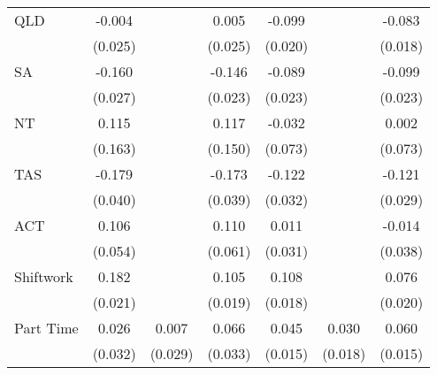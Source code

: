 {\begin{tabular}{l*{6}{c}}
QLD                 &      -0.004         &                     &       0.005         &      -0.099\sym{***}&                     &      -0.083\sym{***}\\
                    &     (0.025)         &                     &     (0.025)         &     (0.020)         &                     &     (0.018)         \\
SA                  &      -0.160\sym{***}&                     &      -0.146\sym{***}&      -0.089\sym{***}&                     &      -0.099\sym{***}\\
                    &     (0.027)         &                     &     (0.023)         &     (0.023)         &                     &     (0.023)         \\
NT                  &       0.115         &                     &       0.117         &      -0.032         &                     &       0.002         \\
                    &     (0.163)         &                     &     (0.150)         &     (0.073)         &                     &     (0.073)         \\
TAS                 &      -0.179\sym{***}&                     &      -0.173\sym{***}&      -0.122\sym{***}&                     &      -0.121\sym{***}\\
                    &     (0.040)         &                     &     (0.039)         &     (0.032)         &                     &     (0.029)         \\
ACT                 &       0.106\sym{*}  &                     &       0.110\sym{*}  &       0.011         &                     &      -0.014         \\
                    &     (0.054)         &                     &     (0.061)         &     (0.031)         &                     &     (0.038)         \\
Shiftwork           &       0.182\sym{***}&                     &       0.105\sym{***}&       0.108\sym{***}&                     &       0.076\sym{***}\\
                    &     (0.021)         &                     &     (0.019)         &     (0.018)         &                     &     (0.020)         \\
Part Time           &       0.026         &       0.007         &       0.066\sym{**} &       0.045\sym{***}&       0.030\sym{*}  &       0.060\sym{***}\\
                    &     (0.032)         &     (0.029)         &     (0.033)         &     (0.015)         &     (0.018)         &     (0.015)         \\

\end{tabular}}
